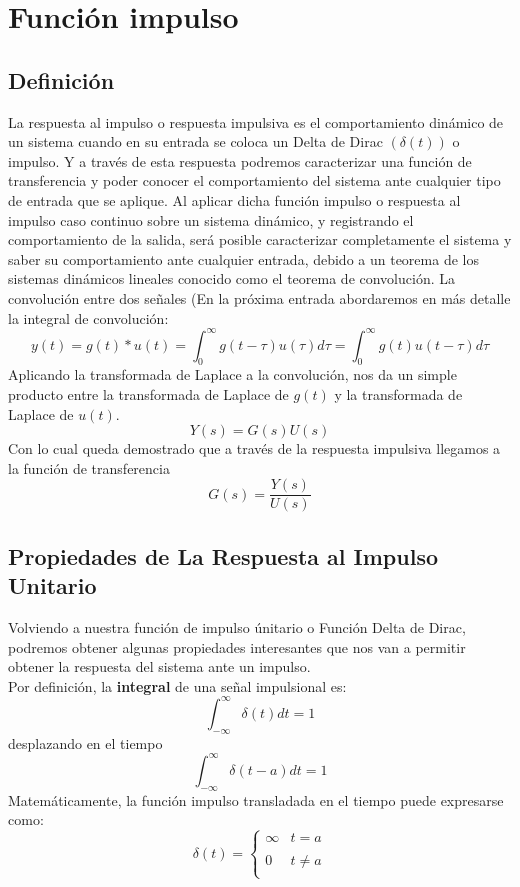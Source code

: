 \documentclass[12pt,a4paper,twoside,onecolumn,openany]{book}
\begin{document}
\chapter{Función impulso}
\section{Definición}
La respuesta al impulso o respuesta impulsiva es el comportamiento dinámico de un sistema cuando en su entrada se coloca un Delta de Dirac $(\delta(t))$ o impulso. Y a través de esta respuesta podremos caracterizar una función de transferencia y poder conocer el comportamiento del sistema ante cualquier tipo de entrada que se aplique.
Al aplicar dicha función impulso o respuesta al impulso caso continuo sobre un sistema dinámico, y registrando el comportamiento de la salida, será posible caracterizar completamente el sistema y saber su comportamiento ante cualquier entrada, debido a un teorema de los sistemas dinámicos lineales conocido como el teorema de convolución.
La convolución entre dos señales (En la próxima entrada abordaremos en más detalle la integral de convolución:
\[
y(t)=g(t)*u(t)= \int_ { 0 } ^ { \infty } g(t-\tau)u(\tau)d\tau= \int_ { 0 } ^ { \infty } g(t)u(t-\tau)d\tau
\]
Aplicando la transformada de Laplace a la convolución, nos da un simple producto entre la transformada de Laplace de $g(t)$ y la transformada de Laplace de $u(t)$.
\[
Y(s)=G(s)U(s)
\]
Con lo cual queda demostrado que a través de la respuesta impulsiva llegamos a la función de transferencia
\[
G(s)= \frac{Y(s)}{U(s)}
\]
\section{Propiedades de La Respuesta al Impulso Unitario}
Volviendo a nuestra función de impulso únitario o Función Delta de Dirac, podremos obtener algunas propiedades interesantes que nos van a permitir obtener la respuesta del sistema ante un impulso.
\\
Por definición, la \textbf{integral} de una señal impulsional es:
\[
\int_ { -\infty } ^ { \infty } \delta(t)dt=1
\]
desplazando en el tiempo
\[
\int_ { -\infty } ^ { \infty } \delta(t-a)dt=1
\]
Matemáticamente, la función impulso transladada en el tiempo puede expresarse como:
\[
\delta(t)= \left\{ \begin{array}{lcc}
             \infty   & t = a \\
             \\ 0  & t \neq a \\
             \end{array}
   \right.
 \]
\end{document}
